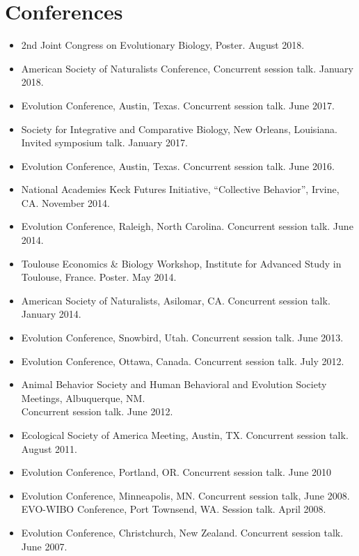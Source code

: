 \documentclass[11pt]{article}
\begin{document}
  \section{Conferences}

  \begin{itemize}
  \item 2nd Joint Congress on Evolutionary Biology, Poster. August 2018.
  \item American Society of Naturalists Conference, Concurrent session talk. January 2018.
  \item Evolution Conference, Austin, Texas. Concurrent session talk. June 2017.
  \item Society for Integrative and Comparative Biology, New Orleans, Louisiana. Invited symposium talk. January 2017.
  \item Evolution Conference, Austin, Texas. Concurrent session talk. June 2016.
  \item National Academies Keck Futures Initiative, ``Collective Behavior'', Irvine, CA. November 2014.
  \item Evolution Conference, Raleigh, North Carolina. Concurrent session talk. June 2014.
  \item Toulouse Economics \& Biology Workshop, Institute for Advanced Study in Toulouse, France. Poster. May 2014.
  \item American Society of Naturalists, Asilomar, CA. Concurrent session talk. January 2014.
  \item Evolution Conference, Snowbird, Utah. Concurrent session talk. June 2013.
  \item Evolution Conference, Ottawa, Canada. Concurrent session talk. July 2012.
  \item Animal Behavior Society and Human Behavioral and Evolution Society Meetings, Albuquerque, NM.  \\
    Concurrent session talk.  June 2012.
  \item %
    Ecological Society of America Meeting, Austin, TX. Concurrent session talk. August 2011.
  \item %
    Evolution Conference, Portland, OR. Concurrent session talk. June 2010
  \item %
    Evolution Conference, Minneapolis, MN. Concurrent session talk, June 2008. \\
    EVO-WIBO Conference, Port Townsend, WA. Session talk. April 2008. 
  \item %
    Evolution Conference, Christchurch, New Zealand. Concurrent session talk. June 2007. 
  \end{itemize}
\end{document}
